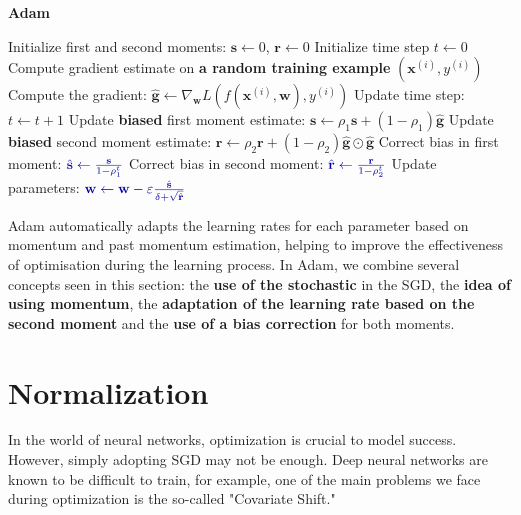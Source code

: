 \begin{algorithm}
\renewcommand\thealgorithm{}
\caption{\textbf{\textcolor{mygreen}{Adam}}}
\begin{algorithmic}[1]
\STATE Initialize first and second moments: $\mathbf{s} \leftarrow 0$, $\mathbf{r} \leftarrow 0$
\STATE Initialize time step $t \leftarrow 0$
\STATE Compute gradient estimate on \textbf{\textcolor{myred}{a random training example}} $(\mathbf{x}^{(i)}, y^{(i)})$
\STATE Compute the gradient: $\mathbf{\hat{g}} \leftarrow \nabla_{\mathbf{w}} L(f(\mathbf{x}^{(i)},\mathbf{w}), y^{(i)})$
\STATE Update time step: $t \leftarrow t + 1$
\STATE Update \textbf{biased} first moment estimate:
$\mathbf{s} \leftarrow \rho_1 \mathbf{s} + (1 - \rho_1) \mathbf{\hat{g}}$ \qquad \quad \qquad \COMMENT{\textbf{\textcolor{gray!90!white}{Momentum Idea}}}
\STATE Update \textbf{biased} second moment estimate:
$\mathbf{r} \leftarrow \rho_2 \mathbf{r} + (1 - \rho_2) \mathbf{\hat{g}} \odot \mathbf{\hat{g}}$ \qquad \COMMENT{\textbf{\textcolor{gray!90!white}{RMSProp Idea}}}
\STATE Correct bias in first moment: $\textcolor{mybluee}{\hat{\mathbf{s}} \leftarrow \frac{\mathbf{s}}{1 - \rho_1^t}}$
\STATE Correct bias in second moment: $\textcolor{mybluee}{\hat{\mathbf{r}} \leftarrow \frac{\mathbf{r}}{1 - \rho_2^t}}$
\STATE Update parameters:
$\textcolor{mybluee}{\mathbf{w} \leftarrow \mathbf{w} - \varepsilon \frac{\hat{\mathbf{s}}}{\delta + \sqrt{\hat{\mathbf{r}}}}}$
\ENDWHILE
\end{algorithmic}
\end{algorithm}

Adam automatically adapts the learning rates for each parameter based on momentum and past momentum estimation, helping to improve the effectiveness of optimisation during the learning process. In Adam, we combine several concepts seen in this section: the \textbf{use of the stochastic} in the SGD, the \textbf{idea of using momentum}, the \textbf{adaptation of the learning rate based on the second moment} and the \textbf{use of a bias correction} for both moments.


\section{Normalization}

\vspace{-0.4cm}
In the world of neural networks, optimization is crucial to model success. However, simply adopting SGD may not be enough. Deep neural networks are known to be difficult to train, for example, one of the main problems we face during optimization is the so-called "Covariate Shift."
\vspace{-0.4cm}

